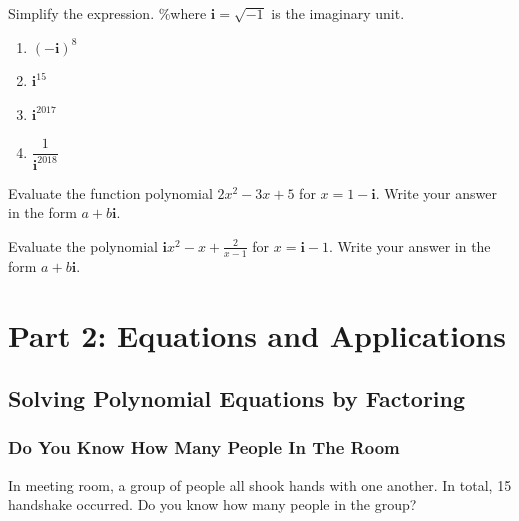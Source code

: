 \documentclass[en,12pt]{elegantbook}
\providecommand{\tightlist}{%
  \setlength{\itemsep}{0pt}\setlength{\parskip}{0pt}}
\newcommand{\ii}{\mathbf{i}}
\let\BeginKnitrBlock\begin \let\EndKnitrBlock\end
\begin{document}
\BeginKnitrBlock{exercise}
\protect\hypertarget{exr:unnamed-chunk-121}{}{\label{exr:unnamed-chunk-121} }
Simplify the expression. \%where \(\ii=\sqrt{-1}\) is the imaginary unit.

\begin{enumerate}
\def\labelenumi{\arabic{enumi}.}
\tightlist
\item
  \((-\ii)^{8}\)
\item
  \(\ii^{15}\)
\item
  \(\ii^{2017}\)
\item
  \(\dfrac1{\ii^{2018}}\)
\end{enumerate}
\EndKnitrBlock{exercise}

\BeginKnitrBlock{exercise}
\protect\hypertarget{exr:unnamed-chunk-122}{}{\label{exr:unnamed-chunk-122} }
Evaluate the function polynomial \(2x^2-3x+5\) for \(x=1-\ii\).
Write your answer in the form \(a+b\ii\).
\EndKnitrBlock{exercise}

\BeginKnitrBlock{exercise}
\protect\hypertarget{exr:unnamed-chunk-123}{}{\label{exr:unnamed-chunk-123} }
Evaluate the polynomial \(\ii x^2-x+\frac{2}{x-1}\) for \(x=\ii-1\).
Write your answer in the form \(a+b\ii\).
\EndKnitrBlock{exercise}

\hypertarget{part-part-2-equations-and-applications}{%
\part*{Part 2: Equations and Applications}\label{part-part-2-equations-and-applications}}

\hypertarget{solving-polynomial-equations-by-factoring}{%
\chapter{Solving Polynomial Equations by Factoring}\label{solving-polynomial-equations-by-factoring}}

\hypertarget{do-you-know-how-many-people-in-the-room}{%
\section{Do You Know How Many People In The Room}\label{do-you-know-how-many-people-in-the-room}}

\BeginKnitrBlock{rmdthink}
In meeting room, a group of people all shook hands with one another. In total, 15 handshake occurred. Do you know how many people in the group?
\EndKnitrBlock{rmdthink}
\end{document}
